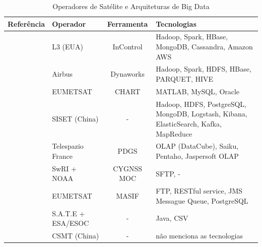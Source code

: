 \begin{table}[htbp]
	\begin{center}
		\caption{Operadores de Satélite e Arquiteturas de Big Data}\label{table:bigdataoperators}
		\begin{tabular}{|C{8em}|C{6em}|c|C{10em}|}
			\hline
			\bfseries Referência                           & \bfseries Operador & \bfseries Ferramenta & \bfseries Tecnologias                                                                \\
			\hline
			\cite{adamskiDataAnalyticsLarge2016}           & L3 (EUA)           & InControl            & Hadoop, Spark, HBase, MongoDB, Cassandra, Amazon AWS                                 \\
			\hline
			\cite{boussoufBigDataBased2018}                & Airbus             & Dynaworks            & Hadoop, Spark, HDFS, HBase, PARQUET, HIVE                                            \\
			\hline
			\cite{schulsterCHARTingFutureOffline2018}      & EUMETSAT           & CHART                & MATLAB, MySQL, Oracle                                                                \\
			\hline
			\cite{zhangBigDataFramework2017}               & SISET (China)      & -                    & Hadoop, HDFS, PostgreSQL, MongoDB, Logstash, Kibana, ElasticSearch, Kafka, MapReduce \\
			\hline
			\cite{yvernesCopernicusGroundSegment2018}      & Telespazio France  & PDGS                 & OLAP (DataCube), Saiku, Pentaho, Jaspersoft OLAP                                     \\
			\hline
			\cite{dischnerCYGNSSMOCMeeting2016}            & SwRI + NOAA        & CYGNSS MOC           & SFTP, -                                                                              \\
			\hline
			\cite{edwardsDealingBigData2018}               & EUMETSAT           & MASIF                & FTP, RESTful service, JMS Messague Queue, PostgreSQL                                 \\
			\hline
			\cite{evansDataMiningDrastically2016}          & S.A.T.E + ESA/ESOC & -                    & Java, CSV                                                                            \\
			\hline
			\cite{fenManagementOperationCommunication2016} & CSMT (China)       & -                    & não menciona as tecnologias                                                          \\

\end{tabular}
\end{center}
\end{table}
